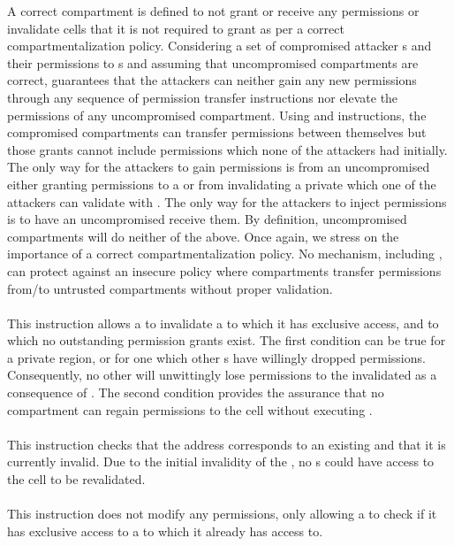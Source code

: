 A correct compartment is defined to not grant or receive any permissions 
or invalidate cells that it is not required to grant as per a correct
compartmentalization policy.
Considering a set of compromised attacker \secdiv{}s and their permissions 
to \cell{}s and assuming that uncompromised compartments are correct,
\seccells guarantees that the attackers can neither gain any new permissions 
through any sequence of permission transfer instructions 
nor elevate the permissions of any uncompromised compartment.
Using \scgrant and \screcv instructions, the compromised compartments can
transfer permissions between themselves but those grants cannot include 
permissions which none of the attackers had initially.
The only way for the attackers to gain permissions is from
an uncompromised \secdiv either granting permissions to a \cell or from 
invalidating a private \cell which one of the attackers can validate with \screval.
The only way for the attackers to inject permissions is to have an
uncompromised \secdiv receive them.
By definition, uncompromised compartments will do neither of the above.
Once again, we stress on the importance of a correct compartmentalization
policy.
No mechanism, including \seccells, can protect against an insecure policy
where compartments transfer permissions from/to untrusted compartments
without proper validation.

\paragraph{\scinval} 
This instruction allows a \secdiv to invalidate a \cell to which
it has exclusive access, and to which no outstanding permission grants
exist.
The first condition can be true for a private region, or for one
which other \secdiv{}s have willingly dropped permissions.
Consequently, no other \secdiv will unwittingly lose permissions to
the invalidated \cell as a consequence of \scinval.
The second condition provides the assurance that no compartment can
regain permissions to the cell without executing \screval.

\paragraph{\screval} 
This instruction checks that the address corresponds to an existing 
\cell{} and that it is currently invalid. 
Due to the initial invalidity of the \cell, no \secdiv{}s could have
access to the cell to be revalidated.

\paragraph{\scexcl}
This instruction does not modify any permissions, only allowing a
\secdiv{} to check if it has exclusive access to a \cell{} to which
it already has access to.



